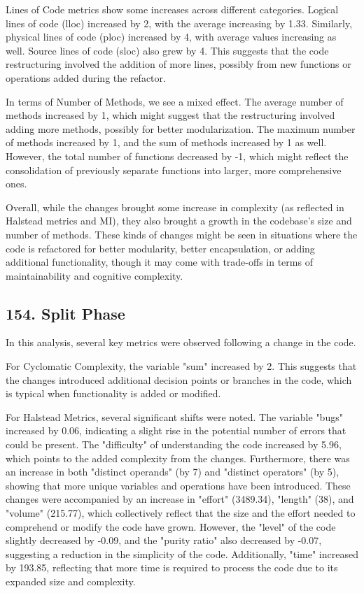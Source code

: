 Lines of Code metrics show some increases across different categories. Logical lines of code (lloc) increased by 2, with the average increasing by 1.33. Similarly, physical lines of code (ploc) increased by 4, with average values increasing as well. Source lines of code (sloc) also grew by 4. This suggests that the code restructuring involved the addition of more lines, possibly from new functions or operations added during the refactor.

In terms of Number of Methods, we see a mixed effect. The average number of methods increased by 1, which might suggest that the restructuring involved adding more methods, possibly for better modularization. The maximum number of methods increased by 1, and the sum of methods increased by 1 as well. However, the total number of functions decreased by -1, which might reflect the consolidation of previously separate functions into larger, more comprehensive ones.

Overall, while the changes brought some increase in complexity (as reflected in Halstead metrics and MI), they also brought a growth in the codebase's size and number of methods. These kinds of changes might be seen in situations where the code is refactored for better modularity, better encapsulation, or adding additional functionality, though it may come with trade-offs in terms of maintainability and cognitive complexity.

\subsection{154. Split Phase}

In this analysis, several key metrics were observed following a change in the code.

For Cyclomatic Complexity, the variable "sum" increased by 2. This suggests that the changes introduced additional decision points or branches in the code, which is typical when functionality is added or modified.

For Halstead Metrics, several significant shifts were noted. The variable "bugs" increased by 0.06, indicating a slight rise in the potential number of errors that could be present. The "difficulty" of understanding the code increased by 5.96, which points to the added complexity from the changes. Furthermore, there was an increase in both "distinct operands" (by 7) and "distinct operators" (by 5), showing that more unique variables and operations have been introduced. These changes were accompanied by an increase in "effort" (3489.34), "length" (38), and "volume" (215.77), which collectively reflect that the size and the effort needed to comprehend or modify the code have grown. However, the "level" of the code slightly decreased by -0.09, and the "purity ratio" also decreased by -0.07, suggesting a reduction in the simplicity of the code. Additionally, "time" increased by 193.85, reflecting that more time is required to process the code due to its expanded size and complexity.

